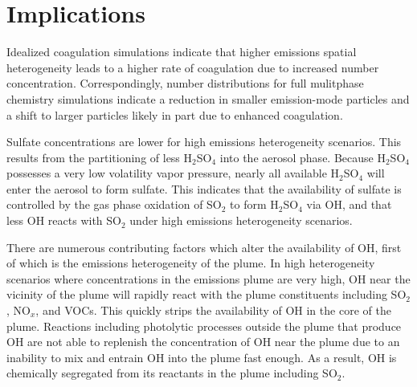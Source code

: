 
\section{Implications}


Idealized coagulation simulations indicate that higher emissions spatial heterogeneity leads to a higher rate of coagulation due to increased number concentration. Correspondingly, number distributions for full mulitphase chemistry simulations indicate a reduction in smaller emission-mode particles and a shift to larger particles likely in part due to enhanced coagulation.

Sulfate concentrations are lower for high emissions heterogeneity scenarios. This results from the partitioning of less H$_2$SO$_4$ into the aerosol phase. Because H$_2$SO$_4$ possesses a very low volatility vapor pressure, nearly all available H$_2$SO$_4$ will enter the aerosol to form sulfate. This indicates that the availability of sulfate is controlled by the gas phase oxidation of SO$_2$ to form H$_2$SO$_4$ via OH, and that less OH reacts with SO$_2$ under high emissions heterogeneity scenarios. 

There are numerous contributing factors which alter the availability of OH, first of which is the emissions heterogeneity of the plume. In high heterogeneity scenarios where concentrations in the emissions plume are very high, OH near the vicinity of the plume will rapidly react with the plume constituents including SO$_2$, NO$_x$, and VOCs. This quickly strips the availability of OH in the core of the plume. Reactions including photolytic processes outside the plume that produce OH are not able to replenish the concentration of OH near the plume due to an inability to mix and entrain OH into the plume fast enough. As a result, OH is chemically segregated from its reactants in the plume including SO$_2$. 

